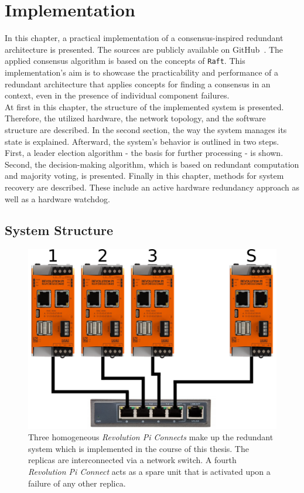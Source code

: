 \chapter{Implementation}
\label{cpt:Implementation}

In this chapter, a practical implementation of a consensus-inspired redundant architecture is presented.
The sources are publicly available on GitHub~\cite{GitHubSources}.
The applied consensus algorithm is based on the concepts of \texttt{Raft}.
This implementation's aim is to showcase the practicability and performance of a redundant architecture that applies  concepts for finding a consensus in an  context, even in the presence of individual component failures.
\\

At first in this chapter, the structure of the implemented system is presented.
Therefore, the utilized hardware, the network topology, and the software structure are described.
In the second section, the way the system manages its state is explained.
Afterward, the system's behavior is outlined in two steps.
First, a leader election algorithm - the basis for further processing - is shown.
Second, the decision-making algorithm, which is based on redundant computation and majority voting, is presented.
Finally in this chapter, methods for system recovery are described.
These include an active hardware redundancy approach as well as a hardware watchdog.

\section{System Structure}

\begin{figure}[!ht]
	\centering
	\includegraphics[width=0.8\linewidth]{images/setup}
	\caption{Three homogeneous \textit{Revolution Pi Connects} make up the redundant system which is implemented in the course of this thesis. The replicas are interconnected via a network switch. A fourth \textit{Revolution Pi Connect} acts as a spare unit that is activated upon a failure of any other replica.}
	\label{fig:SystemSetup}
\end{figure}

